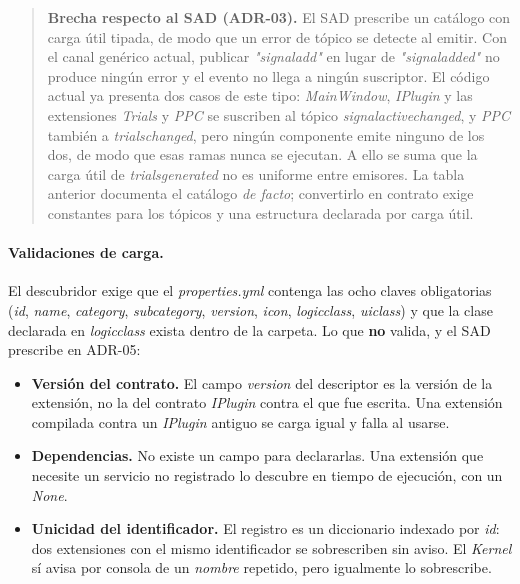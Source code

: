 \documentclass[12pt,letterpaper,oneside]{article}
\DeclareRobustCommand{\_}{\textunderscore\allowbreak}
\begin{document}
\begin{quote}
\textbf{Brecha respecto al SAD (ADR-03).} El SAD prescribe un catálogo con carga útil tipada, de modo que un error de tópico se detecte al emitir. Con el canal genérico actual, publicar \textit{"signal\_add"} en lugar de \textit{"signal\_added"} no produce ningún error y el evento no llega a ningún suscriptor. El código actual ya presenta dos casos de este tipo: \textit{MainWindow}, \textit{IPlugin} y las extensiones \textit{Trials} y \textit{PPC} se suscriben al tópico \textit{signal\_active\_changed}, y \textit{PPC} también a \textit{trials\_changed}, pero ningún componente emite ninguno de los dos, de modo que esas ramas nunca se ejecutan. A ello se suma que la carga útil de \textit{trials\_generated} no es uniforme entre emisores. La tabla anterior documenta el catálogo \textit{de facto}; convertirlo en contrato exige constantes para los tópicos y una estructura declarada por carga útil.
\end{quote}

\paragraph{Validaciones de carga.} El descubridor exige que el \textit{properties.yml} contenga las ocho claves obligatorias (\textit{id}, \textit{name}, \textit{category}, \textit{subcategory}, \textit{version}, \textit{icon}, \textit{logic\_class}, \textit{ui\_class}) y que la clase declarada en \textit{logic\_class} exista dentro de la carpeta. Lo que \textbf{no} valida, y el SAD prescribe en ADR-05:

\begin{itemize}
    \item \textbf{Versión del contrato.} El campo \textit{version} del descriptor es la versión de la extensión, no la del contrato \textit{IPlugin} contra el que fue escrita. Una extensión compilada contra un \textit{IPlugin} antiguo se carga igual y falla al usarse.
    \item \textbf{Dependencias.} No existe un campo para declararlas. Una extensión que necesite un servicio no registrado lo descubre en tiempo de ejecución, con un \textit{None}.
    \item \textbf{Unicidad del identificador.} El registro es un diccionario indexado por \textit{id}: dos extensiones con el mismo identificador se sobrescriben sin aviso. El \textit{Kernel} sí avisa por consola de un \textit{nombre} repetido, pero igualmente lo sobrescribe.
\end{itemize}
\end{document}

